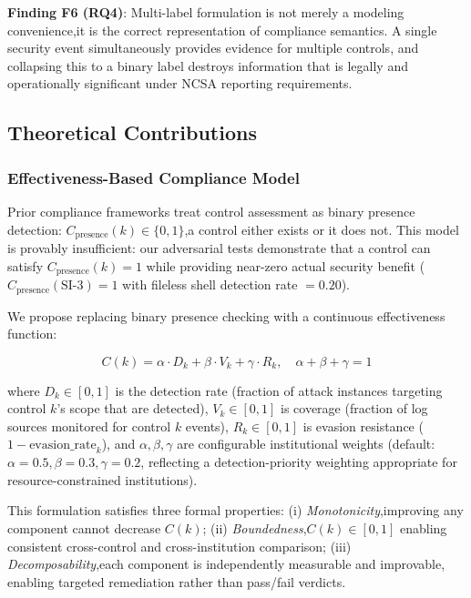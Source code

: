 \documentclass[futureinternet,article,submit,pdftex,moreauthors]{Definitions/mdpi}
\begin{document}
\textbf{Finding F6 (RQ4)}: Multi-label formulation is not merely a modeling convenience,it
is the correct representation of compliance semantics. A single security event simultaneously
provides evidence for multiple controls, and collapsing this to a binary label destroys
information that is legally and operationally significant under NCSA reporting requirements.

\subsection{Theoretical Contributions}
\label{sec:theory}

\subsubsection{Effectiveness-Based Compliance Model}

Prior compliance frameworks treat control assessment as binary presence detection:
$C_{\text{presence}}(k) \in \{0, 1\}$,a control either exists or it does not. This model
is provably insufficient: our adversarial tests demonstrate that a control can satisfy
$C_{\text{presence}}(k) = 1$ while providing near-zero actual security benefit
($C_{\text{presence}}(\text{SI-3}) = 1$ with fileless shell detection rate $= 0.20$).

We propose replacing binary presence checking with a continuous effectiveness function:
\begin{linenomath}
\begin{equation}
C(k) = \alpha \cdot D_k + \beta \cdot V_k + \gamma \cdot R_k, \quad \alpha + \beta + \gamma = 1
\label{eq:compliance}
\end{equation}
\end{linenomath}
where $D_k \in [0,1]$ is the detection rate (fraction of attack instances targeting control
$k$'s scope that are detected), $V_k \in [0,1]$ is coverage (fraction of log sources
monitored for control $k$ events), $R_k \in [0,1]$ is evasion resistance
($1 - \text{evasion\_rate}_k$), and $\alpha, \beta, \gamma$ are configurable institutional
weights (default: $\alpha = 0.5, \beta = 0.3, \gamma = 0.2$, reflecting a detection-priority
weighting appropriate for resource-constrained institutions).

This formulation satisfies three formal properties: (i) \textit{Monotonicity},improving any
component cannot decrease $C(k)$; (ii) \textit{Boundedness},$C(k) \in [0,1]$ enabling
consistent cross-control and cross-institution comparison; (iii) \textit{Decomposability},each
component is independently measurable and improvable, enabling targeted remediation rather
than pass/fail verdicts.
\end{document}
